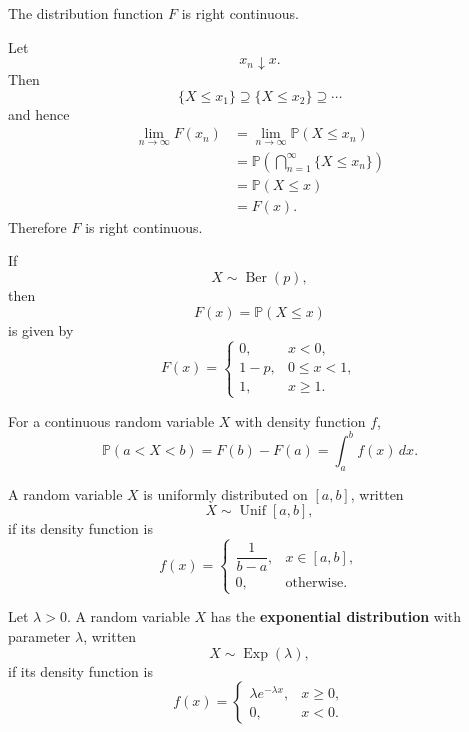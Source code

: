 \begin{propositionenv}
The distribution function $F$ is right continuous.
\end{propositionenv}

\begin{proofenv}
Let
\[
    x_n\downarrow x.
\]
Then
\[
    \{X\le x_1\}\supseteq
    \{X\le x_2\}\supseteq\cdots
\]
and hence
\[
\begin{aligned}
    \lim_{n\to\infty}F(x_n)
    &=
    \lim_{n\to\infty}\mathbb P(X\le x_n)\\
    &=
    \mathbb P\left(
        \bigcap_{n=1}^{\infty}\{X\le x_n\}
    \right)\\
    &=
    \mathbb P(X\le x)\\
    &=F(x).
\end{aligned}
\]
Therefore $F$ is right continuous.
\end{proofenv}

\begin{exampleenv}
If
\[
    X\sim\operatorname{Ber}(p),
\]
then
\[
    F(x)=\mathbb P(X\le x)
\]
is given by
\[
F(x)=
\begin{cases}
0,&x<0,\\
1-p,&0\le x<1,\\
1,&x\ge1.
\end{cases}
\]
\end{exampleenv}

\begin{remark}
For a continuous random variable $X$ with density function $f$,
\[
    \mathbb P(a<X<b)
    =
    F(b)-F(a)
    =
    \int_a^b f(x)\,dx.
\]
\end{remark}

\begin{exampleenv}
A random variable $X$ is uniformly distributed on $[a,b]$, written
\[
    X\sim\operatorname{Unif}[a,b],
\]
if its density function is
\[
    f(x)=
    \begin{cases}
        \dfrac1{b-a},&x\in[a,b],\\[6pt]
        0,&\text{otherwise}.
    \end{cases}
\]
\end{exampleenv}

\begin{definitionenv}
Let $\lambda>0$. A random variable $X$ has the
\textbf{exponential distribution} with parameter $\lambda$, written
\[
    X\sim\operatorname{Exp}(\lambda),
\]
if its density function is
\[
f(x)=
\begin{cases}
    \lambda e^{-\lambda x},&x\ge0,\\
    0,&x<0.
\end{cases}
\]
\end{definitionenv}


